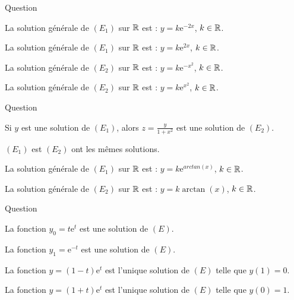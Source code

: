 

\begin{multi}[multiple,feedback=
{Une primitive de \(-2\) est \(-2x\), donc la solution générale de \((E_1)\) sur \(\Rr\) est :
\[y=k\mathrm{e}^{2x},\quad k\in \Rr.\]
Une primitive de \(2x\) est \(x^2\), donc la solution générale de \((E_2)\) sur \(\Rr\) est :
\[y=k\mathrm{e}^{-x^2},\quad k\in \Rr.\]
}]{Question}
    \item La solution générale de \((E_1)\) sur \(\Rr\) est : \(\displaystyle y=k\mathrm{e}^{-2x}\), \(k\in \Rr\).
    \item* La solution générale de \((E_1)\) sur \(\Rr\) est : \(\displaystyle y=k\mathrm{e}^{2x}\), \(k\in \Rr\).
    \item* La solution générale de \((E_2)\) sur \(\Rr\) est : \(\displaystyle y=k\mathrm{e}^{-x^2}\), \(k\in \Rr\).
    \item La solution générale de \((E_2)\) sur \(\Rr\) est : \(\displaystyle y=k\mathrm{e}^{x^2}\), \(k\in \Rr\).
\end{multi}


\begin{multi}[multiple,feedback=
{En divisant \((E_1)\) par \(1+x^2\), on obtient \((E_2)\) : \((E_1)\) et \((E_2)\) ont les mêmes solutions. Une primitive de \(\displaystyle \frac{-1}{1+x^2}\) est \(-\arctan x\), donc la solution générale de \((E_1)\) sur \(\Rr\) est : \(y=k\mathrm{e}^{arctan (x)}\), \(k\in \Rr\).
}]{Question}
    \item Si \(y\) est une solution de \((E_1)\), alors \(\displaystyle z=\frac{y}{1+x^2}\) est une solution de \((E_2)\).
    \item* \((E_1)\) est \((E_2)\) ont les mêmes solutions.
    \item* La solution générale de \((E_1)\) sur \(\Rr\) est : \(\displaystyle y=k\mathrm{e}^{arctan (x)}\), \(k\in \Rr\).
    \item La solution générale de \((E_2)\) sur \(\Rr\) est : \(\displaystyle y=k\arctan (x)\), \(k\in \Rr\).
\end{multi}


\begin{multi}[multiple,feedback=
{On vérifie que \(y_0=t\mathrm{e}^{t}\) est une solution de \((E)\). On vérifie aussi que \(\displaystyle y=(1+t)\mathrm{e}^{t}\) est une solution de \((E)\) et en plus \(y(0)=1\). Cette dernière est donc l'unique solution de \((E)\) telle que \(y(0)=1\).
}]{Question}
    \item* La fonction \(\displaystyle y_0=t\mathrm{e}^{t}\) est une solution de \((E)\).
    \item La fonction \(\displaystyle y_1=\mathrm{e}^{-t}\) est une solution de \((E)\).
    \item La fonction \(\displaystyle y=(1-t)\mathrm{e}^{t}\) est l'unique solution de \((E)\) telle que \(y(1)=0\).
    \item* La fonction \(\displaystyle y=(1+t)\mathrm{e}^{t}\) est l'unique solution de \((E)\) telle que \(y(0)=1\).
\end{multi}


